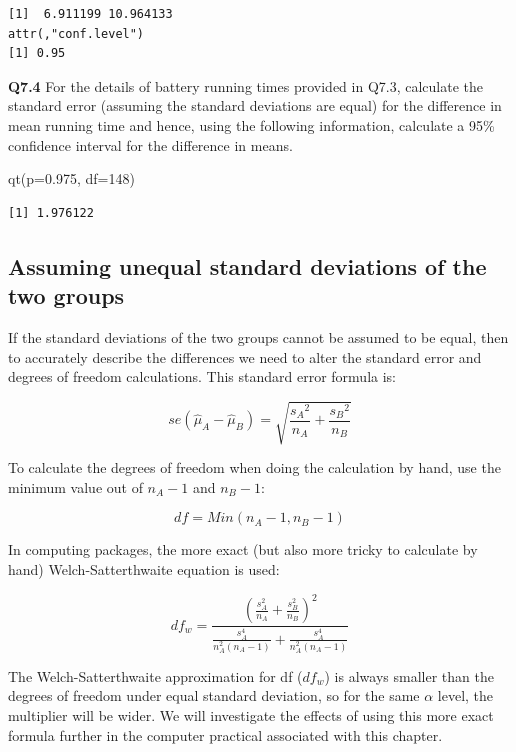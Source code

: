 \documentclass[
  oneside]{krantz}
\newenvironment{Shaded}{\begin{snugshade}}{\end{snugshade}}
\newcommand{\AttributeTok}[1]{\textcolor[rgb]{0.77,0.63,0.00}{#1}}
\newcommand{\DecValTok}[1]{\textcolor[rgb]{0.00,0.00,0.81}{#1}}
\newcommand{\FloatTok}[1]{\textcolor[rgb]{0.00,0.00,0.81}{#1}}
\newcommand{\FunctionTok}[1]{\textcolor[rgb]{0.00,0.00,0.00}{#1}}
\newcommand{\NormalTok}[1]{#1}
\begin{document}
\begin{verbatim}
[1]  6.911199 10.964133
attr(,"conf.level")
[1] 0.95
\end{verbatim}

\textbf{Q7.4} For the details of battery running times provided in Q7.3, calculate the standard error (assuming the standard deviations are equal) for the difference in mean running time and hence, using the following information, calculate a 95\% confidence interval for the difference in means.

\begin{Shaded}
\begin{Highlighting}[]
\FunctionTok{qt}\NormalTok{(}\AttributeTok{p=}\FloatTok{0.975}\NormalTok{, }\AttributeTok{df=}\DecValTok{148}\NormalTok{)}
\end{Highlighting}
\end{Shaded}

\begin{verbatim}
[1] 1.976122
\end{verbatim}

\hypertarget{assuming-unequal-standard-deviations-of-the-two-groups}{%
\subsection{Assuming unequal standard deviations of the two groups}\label{assuming-unequal-standard-deviations-of-the-two-groups}}

If the standard deviations of the two groups cannot be assumed to be equal, then to accurately describe the differences we need to alter the standard error and degrees of freedom calculations. This standard error formula is:

\[se(\hat{\mu}_A - \hat{\mu}_B)= \sqrt{\frac{{s_A}^2}{{n_A}} + \frac{{s_B}^2}{{n_B}}}\]

To calculate the degrees of freedom when doing the calculation by hand, use the minimum value out of \(n_A-1\) and \(n_B -1\):

\[df = Min(n_A-1, n_B -1)\]

In computing packages, the more exact (but also more tricky to calculate by hand) Welch-Satterthwaite equation is used:

\[df_w = \frac{\left(\frac{s_A^2}{n_A} + \frac{s_B^2}{n_B}\right)^2}{\frac{s_A^4}{n_A^2(n_A-1)} + \frac{s_A^4}{n_A^2(n_A-1)}}\]

The Welch-Satterthwaite approximation for df (\(df_w\)) is always smaller than the degrees of freedom under equal standard deviation, so for the same \(\alpha\) level, the multiplier will be wider. We will investigate the effects of using this more exact formula further in the computer practical associated with this chapter.
\end{document}
